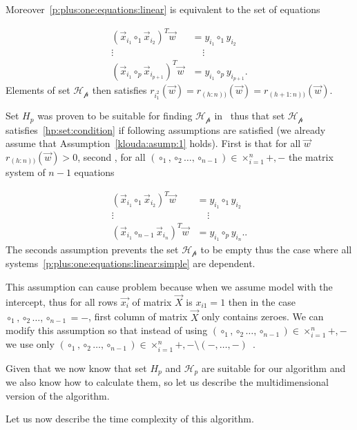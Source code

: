 Moreover~\eqref{p:plus:one:equations:linear} is equivalent to the set of equations


\begin{align} 
    (\vec{x}_{i_1} \circ_1 \vec {x}_{i_2} )^T \vec{w} &= y_{i_1} \circ_1 y_{i_2} \label{p:plus:one:equations:linear:simple}   \\
    \vdots \ \ \  & \ \ \ \  \ \vdots  \nonumber \\ 
    (\vec{x}_{i_1} \circ_p \vec {x}_{i_{p+1}} )^T \vec{w} &= y_{i_1} \circ_p y_{i_{p+1}}. \nonumber 
\end{align}
Elements of set $\mathcal{H_p}$ then satisfies $r_{i_1^2}(\vec{w}) = r_{(h:n))}(\vec{w}) = r_{(h+1:n))}(\vec{w})$.


Set $H_p$ was proven to be suitable for finding $\mathcal{H_p}$ in~\cite{klouda2015exact} thus that set $\mathcal{H_p}$ satisfies~\eqref{hp:set:condition} if following assumptions are satisfied (we already assume that Assumption~\ref{klouda:asump:1} holds). First is that for all $\vec{w}$ $r_{(h:n))}(\vec{w}) > 0$, second , for all 
$(\circ_1,\circ_2 \ldots,  \circ_{n-1}) \in \times^n_{i=1} {+, -}$ the matrix system of $n-1$ equations

\begin{align} 
    (\vec{x}_{i_1} \circ_1 \vec {x}_{i_2} )^T \vec{w} &= y_{i_1} \circ_1 y_{i_2} \label{p:plus:one:equations:linear:simple:to:n}   \\
    \vdots \ \ \  & \ \ \ \  \ \vdots  \nonumber \\ 
    (\vec{x}_{i_1} \circ_{n-1} \vec {x}_{i_{n}} )^T \vec{w} &= y_{i_1} \circ_p y_{i_{n}}. \nonumber.
\end{align}
The seconds assumption prevents the set $\mathcal{H_p}$ to be empty thus the case where all systems~\eqref{p:plus:one:equations:linear:simple} are dependent. 

This assumption can cause problem because when we assume model with the intercept, thus for all rows $\vec{x_i}$ of matrix $\vec{X}$ is $x_{i1} = 1$ then in the case  $\circ_1,\circ_2 \ldots,  \circ_{n-1} = -$, first column of matrix $\vec{X}$ only contains zeroes. We can modify this assumption so that instead of using $(\circ_1,\circ_2 \ldots,  \circ_{n-1}) \in \times^n_{i=1} {+, -}$ we use only $(\circ_1,\circ_2 \ldots,  \circ_{n-1}) \in \times^n_{i=1} {+, -} \setminus {(-, \ldots, -)}$~\cite{klouda2015exact}. 

Given that we now know that set $H_p$ and $\mathcal{H}_p$ are suitable for our algorithm and we also know how to calculate them, so let us describe the multidimensional version of the algorithm.


Let us now describe the time complexity of this algorithm. 

